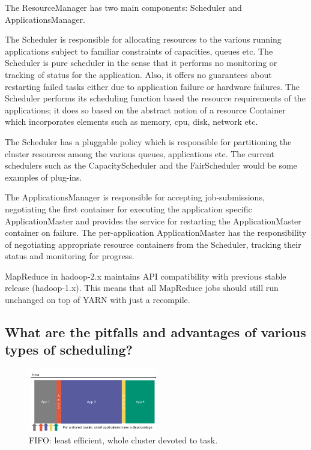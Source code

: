 \documentclass{article}
\begin{document}
The ResourceManager has two main components: Scheduler and ApplicationsManager.

The Scheduler is responsible for allocating resources to the various running applications subject to familiar constraints of capacities, queues etc. The Scheduler is pure scheduler in the sense that it performs no monitoring or tracking of status for the application. Also, it offers no guarantees about restarting failed tasks either due to application failure or hardware failures. The Scheduler performs its scheduling function based the resource requirements of the applications; it does so based on the abstract notion of a resource Container which incorporates elements such as memory, cpu, disk, network etc.

The Scheduler has a pluggable policy which is responsible for partitioning the cluster resources among the various queues, applications etc. The current schedulers such as the CapacityScheduler and the FairScheduler would be some examples of plug-ins.

The ApplicationsManager is responsible for accepting job-submissions, negotiating the first container for executing the application specific ApplicationMaster and provides the service for restarting the ApplicationMaster container on failure. The per-application ApplicationMaster has the responsibility of negotiating appropriate resource containers from the Scheduler, tracking their status and monitoring for progress.

MapReduce in hadoop-2.x maintains API compatibility with previous stable release (hadoop-1.x). This means that all MapReduce jobs should still run unchanged on top of YARN with just a recompile.


\subsection{What are the pitfalls and advantages of various types of scheduling?}

\begin{figure}
  \centering
  \includegraphics[width=0.5\textwidth]{img/fifo.png}
  \caption{FIFO: least efficient, whole cluster devoted to task.}
  \label{fig:fifo}
\end{figure}
\end{document}
